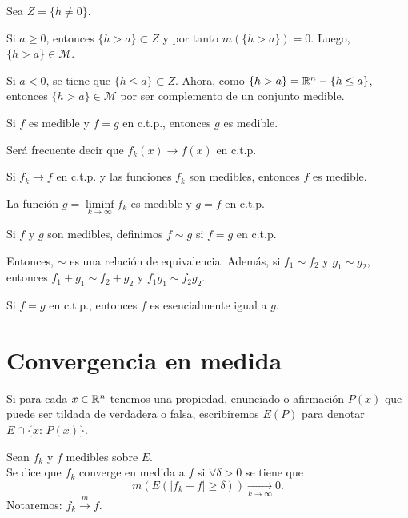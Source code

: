 \begin{demo}
Sea $Z=\{h \neq 0\}$. 

Si $a \geq 0$, entonces $\{h>a\}\subset Z$ y por tanto $m(\{h>a\})=0.$ Luego, $\{h>a\} \in \mathscr{M}$.

Si $a < 0$, se tiene que  $\{h\leq a\}\subset Z$. Ahora,  como $\{h>a\}=\mathbb{R}^n-\{h\leq a\}$, entonces  $\{h>a\} \in \mathscr{M}$ por ser complemento de un conjunto medible.
\end{demo}



\begin{corolario}{}
Si $f$ es medible y $f=g$ en c.t.p., entonces $g$ es medible. 
\end{corolario}


Ser\'a frecuente decir que $f_k(x) \to f(x)$ en c.t.p.

\begin{teorema}{}
Si $f_k \to f$ en c.t.p. y las funciones $f_k$ son medibles, entonces 
$f$ es medible.
\end{teorema}

\begin{demo}
La funci\'on $g=\liminf\limits_{k \to \infty} f_k$ es medible y $g=f$ en c.t.p.
\end{demo}

Si $f$ y $g$ son medibles, definimos $f \sim g$ si $f=g$ en c.t.p.

Entonces, $\sim$ es una relaci\'on de equivalencia. Adem\'as, si $f_1\sim f_2$ y $g_1 \sim g_2$, entonces $f_1+g_1\sim f_2+g_2$ y $f_1g_1\sim f_2g_2$.

Si $f=g$ en c.t.p., entonces $f$ es esencialmente igual a $g$.

\section{Convergencia en medida}

Si para cada $x\in \mathbb{R}^n$ tenemos una propiedad, enunciado o afirmaci\'on $P(x)$ que puede ser tildada de  verdadera o falsa, escribiremos $E(P)$ para denotar $E\cap \{x:\,P(x)\}$.

\begin{definicion}{}
Sean $f_k$ y $f$  medibles sobre $E$.\\
Se dice que $f_k$ converge en medida a $f$ si $\forall \delta>0$ se tiene que 
\[
m(E(|f_k-f|\geq \delta))\xrightarrow[k \to \infty]{} 0.
\]
Notaremos: $f_k \xrightarrow[]{m} f$.
\end{definicion}

